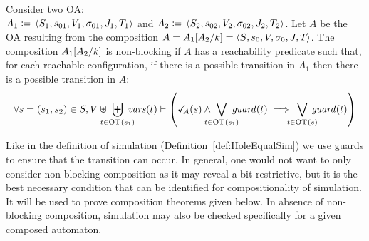 \documentclass[runningheads]{llncs}
\begin{document}
%
\begin{definition} \label{Def:Non-block}
Consider two OA:\\ \(A_1 \defobject \OAg[1]\) and \( A_2 \defobject \OAg[2]\).
Let $A$ be the OA resulting from the composition \(A = A_1{\left[A_2\middle/k\right]}= \left<S_{},s_{0},V_{},\sigma_{0},J_{},T_{}\right>\). 
The composition \(A_1{\left[A_2\middle/k\right]}\) is non-blocking if   \(A \) has a reachability predicate such that, for each reachable configuration, if there is a possible transition in \(A_1\) then there is a possible transition in \(A\):
\[ \forall s = \mpar{s_1, s_2} \in S, V \uplus \biguplus_\subbox{t \in \fOT{s_1}} \fvars{t} \vdash  \left(\reach{A}\mpar{s} \wedge \bigvee_\subbox{t \in \fOT{s_1}} \fguard{t} \implies \bigvee_\subbox{t \in \fOT{s}} \fguard{t} \right)
\]
\end{definition}
Like in the definition of simulation (Definition~\ref{def:HoleEqualSim}) we use guards to ensure that the transition can occur. 
In general, one would not want to only consider non-blocking composition as it may reveal a bit restrictive, but it is the best necessary condition that can be identified for compositionality of simulation. It will be used to prove composition theorems given below. 
In absence of non-blocking composition, simulation may also be checked specifically for a given composed automaton.
\end{document}
